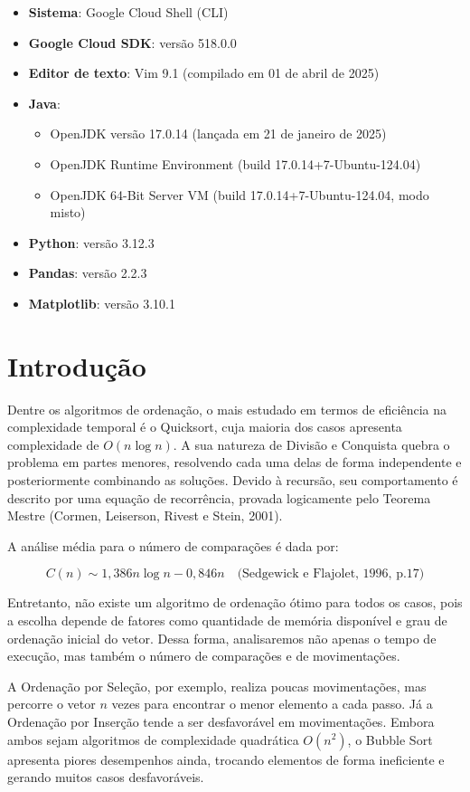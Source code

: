 \documentclass[12pt]{article}
\begin{document}
\begin{itemize}
  \item \textbf{Sistema}: Google Cloud Shell (CLI)
  \item \textbf{Google Cloud SDK}: versão 518.0.0
  \item \textbf{Editor de texto}: Vim 9.1 (compilado em 01 de abril de 2025)
  \item \textbf{Java}:
  \begin{itemize}
    \item OpenJDK versão 17.0.14 (lançada em 21 de janeiro de 2025)
    \item OpenJDK Runtime Environment (build 17.0.14+7-Ubuntu-124.04)
    \item OpenJDK 64-Bit Server VM (build 17.0.14+7-Ubuntu-124.04, modo misto)
  \end{itemize}
  \item \textbf{Python}: versão 3.12.3
  \item \textbf{Pandas}: versão 2.2.3
  \item \textbf{Matplotlib}: versão 3.10.1
\end{itemize}

\section{Introdução} \label{sec:firstpage}

Dentre os algoritmos de ordenação, o mais estudado em termos de eficiência na complexidade temporal é o Quicksort, cuja maioria dos casos apresenta complexidade de $O(n \log n)$. A sua natureza de Divisão e Conquista quebra o problema em partes menores, resolvendo cada uma delas de forma independente e posteriormente combinando as soluções. Devido à recursão, seu comportamento é descrito por uma equação de recorrência, provada logicamente pelo Teorema Mestre (Cormen, Leiserson, Rivest e Stein, 2001).

A análise média para o número de comparações é dada por:

\[
C(n) \sim 1{,}386n \log n - 0{,}846n \quad \text{(Sedgewick e Flajolet, 1996, p.17)}
\]

Entretanto, não existe um algoritmo de ordenação ótimo para todos os casos, pois a escolha depende de fatores como quantidade de memória disponível e grau de ordenação inicial do vetor. Dessa forma, analisaremos não apenas o tempo de execução, mas também o número de comparações e de movimentações.

A Ordenação por Seleção, por exemplo, realiza poucas movimentações, mas percorre o vetor $n$ vezes para encontrar o menor elemento a cada passo. Já a Ordenação por Inserção tende a ser desfavorável em movimentações. Embora ambos sejam algoritmos de complexidade quadrática $O(n^2)$, o Bubble Sort apresenta piores desempenhos ainda, trocando elementos de forma ineficiente e gerando muitos casos desfavoráveis.
\end{document}
